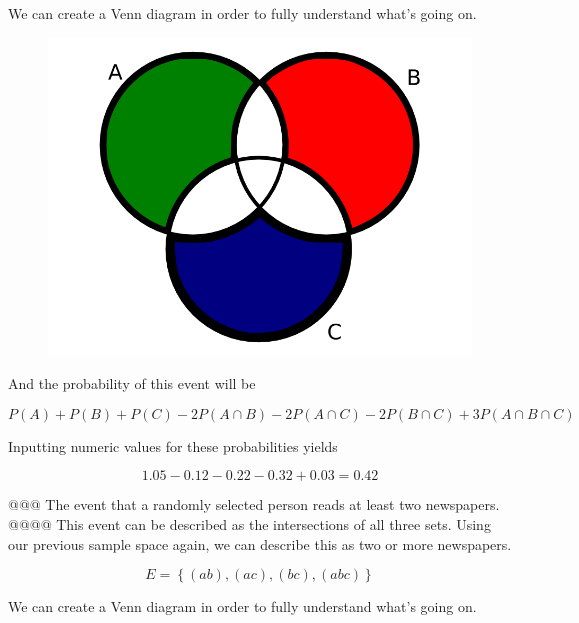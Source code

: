 \documentclass[10pt]{article}
\begin{document}
\begin{easylist}[enumerate]
        We can create a Venn diagram in order to fully understand what's going on.

        \begin{figure}[!ht]
            \centering
            \includegraphics[scale=0.25]{./img/venn1.png}
        \end{figure}

        And the probability of this event will be

        \[ P(A) + P(B) + P(C) - 2 P(A \cap B) - 2 P(A \cap C) - 2 P(B \cap C) + 3 P(A \cap B \cap C) \]

        Inputting numeric values for these probabilities yields

        \[ 1.05 - 0.12 - 0.22 - 0.32 + 0.03 = \boxed{0.42} \]

    @@@ The event that a randomly selected person reads at least two newspapers.
    @@@@ This event can be described as the intersections of all three sets. Using our previous sample space again, we can describe this as two or more newspapers.

        \[ E = \left\{ (ab), (ac), (bc), (abc) \right\} \]

        We can create a Venn diagram in order to fully understand what's going on.


\end{easylist}
\end{document}
